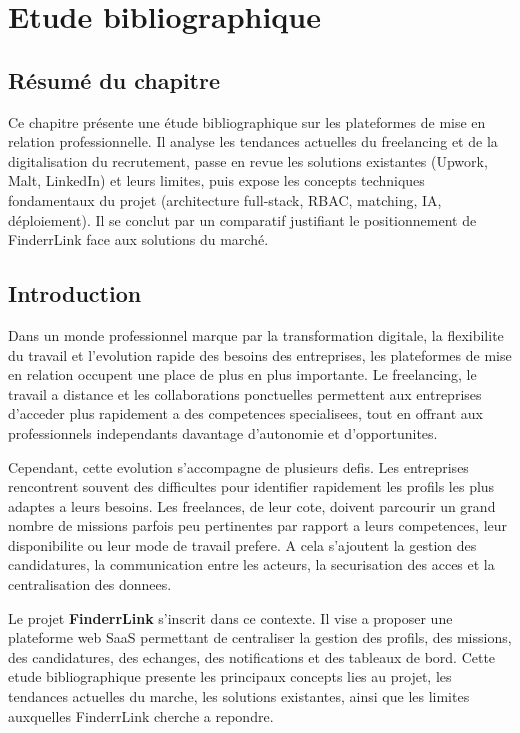\chapter{Etude bibliographique}
\section*{Résumé du chapitre}
 Ce chapitre présente une étude bibliographique sur les plateformes de mise en relation professionnelle. Il analyse les tendances actuelles du freelancing et de la digitalisation du recrutement, passe en revue les solutions existantes (Upwork, Malt, LinkedIn) et leurs limites, puis expose les concepts techniques fondamentaux du projet (architecture full-stack, RBAC, matching, IA, déploiement). Il se conclut par un comparatif justifiant le positionnement de FinderrLink face aux solutions du marché.
\section{Introduction}

Dans un monde professionnel marque par la transformation digitale, la flexibilite du travail et l'evolution rapide des besoins des entreprises, les plateformes de mise en relation occupent une place de plus en plus importante. Le freelancing, le travail a distance et les collaborations ponctuelles permettent aux entreprises d'acceder plus rapidement a des competences specialisees, tout en offrant aux professionnels independants davantage d'autonomie et d'opportunites.

Cependant, cette evolution s'accompagne de plusieurs defis. Les entreprises rencontrent souvent des difficultes pour identifier rapidement les profils les plus adaptes a leurs besoins. Les freelances, de leur cote, doivent parcourir un grand nombre de missions parfois peu pertinentes par rapport a leurs competences, leur disponibilite ou leur mode de travail prefere. A cela s'ajoutent la gestion des candidatures, la communication entre les acteurs, la securisation des acces et la centralisation des donnees.

Le projet \textbf{FinderrLink} s'inscrit dans ce contexte. Il vise a proposer une plateforme web SaaS permettant de centraliser la gestion des profils, des missions, des candidatures, des echanges, des notifications et des tableaux de bord. Cette etude bibliographique presente les principaux concepts lies au projet, les tendances actuelles du marche, les solutions existantes, ainsi que les limites auxquelles FinderrLink cherche a repondre.

